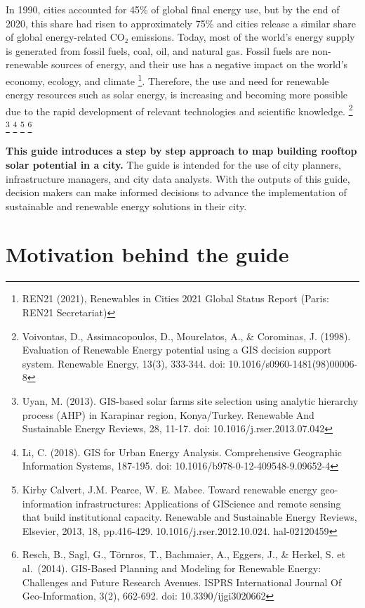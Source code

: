 \documentclass[
]{book}
\begin{document}
In 1990, cities accounted for 45\% of global final energy use, but by the end of 2020, this share had risen to approximately 75\% and cities release a similar share of global energy-related CO₂ emissions. Today, most of the world's energy supply is generated from fossil fuels, coal, oil, and natural gas. Fossil fuels are non-renewable sources of energy, and their use has a negative impact on the world's economy, ecology, and climate \footnote{REN21 (2021), Renewables in Cities 2021 Global Status Report (Paris: REN21 Secretariat)}. Therefore, the use and need for renewable energy resources such as solar energy, is increasing and becoming more possible due to the rapid development of relevant technologies and scientific knowledge. \footnote{Voivontas, D., Assimacopoulos, D., Mourelatos, A., \& Corominas, J. (1998). Evaluation of Renewable Energy potential using a GIS decision support system. Renewable Energy, 13(3), 333-344. doi: 10.1016/s0960-1481(98)00006-8} \footnote{Uyan, M. (2013). GIS-based solar farms site selection using analytic hierarchy process (AHP) in Karapinar region, Konya/Turkey. Renewable And Sustainable Energy Reviews, 28, 11-17. doi: 10.1016/j.rser.2013.07.042} \footnote{Li, C. (2018). GIS for Urban Energy Analysis. Comprehensive Geographic Information Systems, 187-195. doi: 10.1016/b978-0-12-409548-9.09652-4} \footnote{Kirby Calvert, J.M. Pearce, W. E. Mabee. Toward renewable energy geo-information infrastructures: Applications of GIScience and remote sensing that build institutional capacity. Renewable and Sustainable Energy Reviews, Elsevier, 2013, 18, pp.416-429. 10.1016/j.rser.2012.10.024. hal-02120459} \footnote{Resch, B., Sagl, G., Törnros, T., Bachmaier, A., Eggers, J., \& Herkel, S. et al.~(2014). GIS-Based Planning and Modeling for Renewable Energy: Challenges and Future Research Avenues. ISPRS International Journal Of Geo-Information, 3(2), 662-692. doi: 10.3390/ijgi3020662}

\textbf{This guide introduces a step by step approach to map building rooftop solar potential in a city.}
The guide is intended for the use of city planners, infrastructure managers, and city data analysts. With the outputs of this guide, decision makers can make informed decisions to advance the implementation of sustainable and renewable energy solutions in their city.

\hypertarget{motivation-behind-the-guide}{%
\section*{Motivation behind the guide}\label{motivation-behind-the-guide}}
\end{document}
